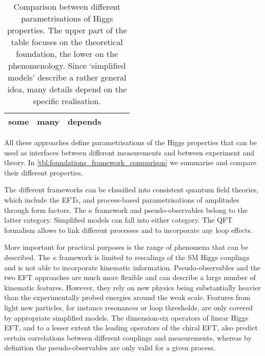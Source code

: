 \begin{table}
\begin{tabularx}{\textwidth}{LLLLLL}
    some & 
    many &
    depends \\
    \bottomrule
  \end{tabularx}
  \caption[Comparison between different parametrisations of Higgs properties]{Comparison
    between different parametrisations of Higgs properties. The upper part of the table
    focuses on the theoretical foundation, the lower on the phenomenology.
    Since `simplified models' describe a rather general idea, many
    details depend on the specific realisation.}
  \label{tbl:foundations_framework_comparison}
\end{table}

All these approaches define parametrisations of the Higgs properties
that can be used as interfaces between different measurements and
between experiment and theory. In
\autoref{tbl:foundations_framework_comparison} we summarise and
compare their different properties.

The different frameworks can be classified into consistent quantum
field theories, which include the EFTs, and process-based
parametrisations of amplitudes through form factors. The $\kappa$
framework and pseudo-observables belong to the latter
category. Simplified models can fall into either category. The QFT
formalism allows to link different processes and to incorporate any
loop effects.

More important for practical purposes is the range of phenomena that
can be described. The $\kappa$ framework is limited to rescalings of
the SM Higgs couplings and is not able to incorporate kinematic
information. Pseudo-observables and the two EFT approaches are much
more flexible and can describe a large number of kinematic
features. However, they rely on new physics being substantially
heavier than the experimentally probed energies around the weak
scale. Features from light new particles, for instance resonances or
loop thresholds, are only covered by appropriate simplified
models. The dimension-six operators of linear Higgs EFT, and to a
lesser extent the leading operators of the chiral EFT, also predict
certain correlations between different couplings and measurements,
whereas by definition the pseudo-observables are only valid for a given
process.

